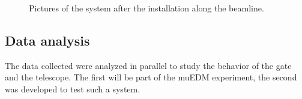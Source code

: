 \begin{refsection}
        \begin{figure}   
            \centering
            \hfill
            \caption[muEDM 2022: installation on the beamline]{Pictures of the system after the installation along the beamline.}
            \label{fig:muEDM:bt2022:blobs}
        \end{figure}
        
    \subsection{Data analysis}
        The data collected were analyzed in parallel to study the behavior of the gate and the telescope. 
        The first will be part of the muEDM experiment, the second was developed to test such a system.


\end{refsection}
